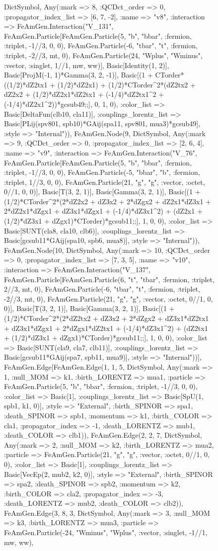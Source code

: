 \documentclass{revtex4}
\begin{document}
\begin{figure}[!htb]
\begin{center}
{Dict{Symbol, Any}(:mark => 8, :QCDct_order => 0, :propagator_index_list => [6, 7, -2], :name => "v8", :interaction => FeAmGen.Interaction("V_131", FeAmGen.Particle[FeAmGen.Particle(5, "b", "bbar", :fermion, :triplet, -1//3, 0, 0), FeAmGen.Particle(-6, "tbar", "t", :fermion, :triplet, -2//3, mt, 0), FeAmGen.Particle(24, "Wplus", "Wminus", :vector, :singlet, 1//1, mw, ww)], Basic[Identity(1, 2)], Basic[ProjM(-1, 1)*Gamma(3, 2, -1)], Basic[(1 + CTorder*((1/2)*dZ2tx1 + (1/2)*dZ2x1) + (1/2)*CTorder^2*(dZ2tx2 + dZ2x2 + (1/2)*dZ2x1*dZ2tx1 + (-1/4)*dZ2tx1^2 + (-1/4)*dZ2x1^2))*gcsub49;;], 0, 1, 0), :color_list => Basic[DeltaFun(clb10, cla11)], :couplings_lorentz_list => Basic[PLij(spv801, spb10)*GAij(spa11, spv801, mua3)*gcsub49], :style => "Internal")), FeAmGen.Node(9, Dict{Symbol, Any}(:mark => 9, :QCDct_order => 0, :propagator_index_list => [2, 6, 4], :name => "v9", :interaction => FeAmGen.Interaction("V_76", FeAmGen.Particle[FeAmGen.Particle(5, "b", "bbar", :fermion, :triplet, -1//3, 0, 0), FeAmGen.Particle(-5, "bbar", "b", :fermion, :triplet, 1//3, 0, 0), FeAmGen.Particle(21, "g", "g", :vector, :octet, 0//1, 0, 0)], Basic[T(3, 2, 1)], Basic[Gamma(3, 2, 1)], Basic[(1 + (1/2)*CTorder^2*(2*dZ2x2 + dZ3x2 + 2*dZgx2 + dZ2x1*dZ3x1 + 2*dZ2x1*dZgx1 + dZ3x1*dZgx1 + (-1/4)*dZ3x1^2) + (dZ2x1 + (1/2)*dZ3x1 + dZgx1)*CTorder)*gcsub11;;], 1, 0, 0), :color_list => Basic[SUNT(cla8, cla10, clb6)], :couplings_lorentz_list => Basic[gcsub11*GAij(spa10, spb6, mua8)], :style => "Internal")), FeAmGen.Node(10, Dict{Symbol, Any}(:mark => 10, :QCDct_order => 0, :propagator_index_list => [7, 3, 5], :name => "v10", :interaction => FeAmGen.Interaction("V_137", FeAmGen.Particle[FeAmGen.Particle(6, "t", "tbar", :fermion, :triplet, 2//3, mt, 0), FeAmGen.Particle(-6, "tbar", "t", :fermion, :triplet, -2//3, mt, 0), FeAmGen.Particle(21, "g", "g", :vector, :octet, 0//1, 0, 0)], Basic[T(3, 2, 1)], Basic[Gamma(3, 2, 1)], Basic[(1 + (1/2)*CTorder^2*(2*dZ2tx2 + dZ3x2 + 2*dZgx2 + dZ3x1*dZ2tx1 + dZ3x1*dZgx1 + 2*dZgx1*dZ2tx1 + (-1/4)*dZ3x1^2) + (dZ2tx1 + (1/2)*dZ3x1 + dZgx1)*CTorder)*gcsub11;;], 1, 0, 0), :color_list => Basic[SUNT(cla9, cla7, clb11)], :couplings_lorentz_list => Basic[gcsub11*GAij(spa7, spb11, mua9)], :style => "Internal"))], FeAmGen.Edge[FeAmGen.Edge(1, 1, 5, Dict{Symbol, Any}(:mark => 1, :null_MOM => k1, :birth_LORENTZ => mua1, :particle => FeAmGen.Particle(5, "b", "bbar", :fermion, :triplet, -1//3, 0, 0), :color_list => Basic[1], :couplings_lorentz_list => Basic[SpU(1, spb1, k1, 0)], :style => "External", :birth_SPINOR => spa1, :death_SPINOR => spb1, :momentum => k1, :birth_COLOR => cla1, :propagator_index => -1, :death_LORENTZ => mub1, :death_COLOR => clb1)), FeAmGen.Edge(2, 2, 7, Dict{Symbol, Any}(:mark => 2, :null_MOM => k2, :birth_LORENTZ => mua2, :particle => FeAmGen.Particle(21, "g", "g", :vector, :octet, 0//1, 0, 0), :color_list => Basic[1], :couplings_lorentz_list => Basic[VecEp(2, mub2, k2, 0)], :style => "External", :birth_SPINOR => spa2, :death_SPINOR => spb2, :momentum => k2, :birth_COLOR => cla2, :propagator_index => -3, :death_LORENTZ => mub2, :death_COLOR => clb2)), FeAmGen.Edge(3, 8, 3, Dict{Symbol, Any}(:mark => 3, :null_MOM => k3, :birth_LORENTZ => mua3, :particle => FeAmGen.Particle(-24, "Wminus", "Wplus", :vector, :singlet, -1//1, mw, ww), }
\end{center}
\end{figure}
\end{document}
